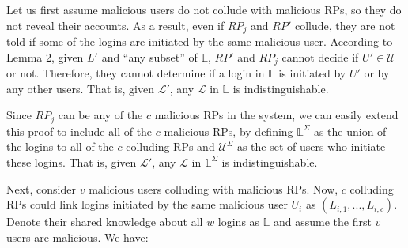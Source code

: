 Let us first assume malicious users do not collude with malicious RPs, so they do not reveal their accounts.
As a result, even if $RP_j$ and $RP'$ collude, they are not told if some of the logins are initiated by the same malicious user. According to Lemma 2, given $L'$ and ``any subset'' of $\mathbb{L}$, $RP'$ and $RP_j$ cannot decide if $U' \in \mathcal{U}$ or not.
Therefore, they cannot determine if a login in $\mathbb{L}$ is initiated by $U'$ or by any other users.
That is, given $\mathcal{L}'$,
    any $\mathcal{L}$ in $\mathbb{L}$ is indistinguishable.


Since $RP_j$ can be any of the $c$ malicious RPs in the system, we can easily extend this proof to include all of the $c$ malicious RPs, by defining $\mathbb{L}^{\Sigma}$ as the union of the logins to all of the $c$ colluding RPs and $\mathcal{U}^{\Sigma}$ as the set of users who initiate these logins.
That is, given $\mathcal{L}'$,
    any $\mathcal{L}$ in $\mathbb{L}^{\Sigma}$ is indistinguishable.






Next, consider $v$ malicious users colluding with malicious RPs.
Now, $c$ colluding RPs could link logins initiated by the same malicious user $U_i$ as $(L_{i,1},..., L_{i,c})$. Denote their shared knowledge about all $w$ logins as $\mathbb{L}$ and assume the first $v$ users are malicious. We have:

